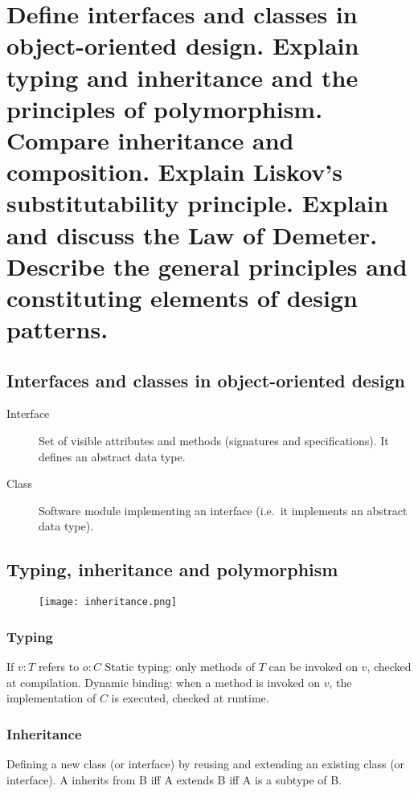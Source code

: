 \clearpage{}
\section{Define interfaces and classes in object-oriented design. Explain
typing and inheritance and the principles of polymorphism. Compare
inheritance and composition. Explain Liskov’s substitutability principle.
Explain and discuss the Law of Demeter. Describe the general principles and
constituting elements of design patterns.}

\subsection{Interfaces and classes in object-oriented design}

\begin{description}
    \item[Interface] Set of visible attributes and methods (signatures and specifications). It defines an abstract data type.
    \item[Class] Software module implementing an interface (i.e.\ it implements an abstract data type).
\end{description}

\subsection{Typing, inheritance and polymorphism}

\begin{figure}[!ht]
    \centering
    \texttt{[image: inheritance.png]}
\end{figure}

\subsubsection{Typing}

If $v: T$ refers to $o: C$
Static typing: only methods of $T$ can be invoked on $v$, checked at compilation.
Dynamic binding: when a method is invoked on $v$, the implementation of $C$ is executed,
checked at runtime.

\subsubsection{Inheritance}
Defining a new class (or interface) by reusing and extending an existing class (or interface).
A inherits from B iff A extends B iff A is a subtype of B.

